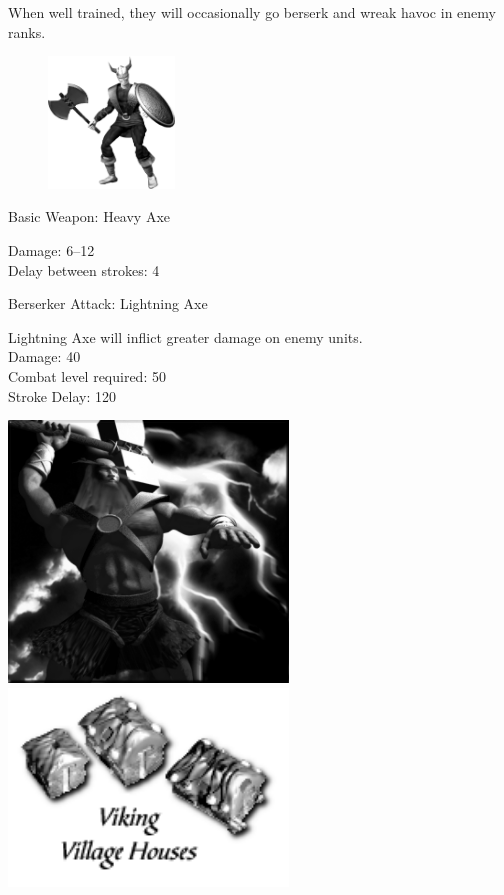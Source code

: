 When well trained, they will occasionally go berserk and wreak havoc in enemy ranks.

\begin{figure}
	\begin{center}
		\vspace{-20pt}
		\includegraphics[width=0.3\textwidth]{Aviking}
	\end{center}
	\vspace{-20pt}
\end{figure}

Basic Weapon: Heavy Axe
\begin{adjustwidth}{1cm}{}
	Damage: 6–12 \\
	Delay between strokes: 4
\end{adjustwidth}
Berserker Attack: Lightning Axe
\begin{adjustwidth}{1cm}{}
	Lightning Axe will inflict greater damage on enemy units. \\
	Damage: 40 \\
	Combat level required: 50 \\
	Stroke Delay: 120 
\end{adjustwidth}

\begin{center}
	\includegraphics[width=74.25mm]{Athor}\includegraphics[width=74.25mm]{Ivikinghouse}
\end{center}

